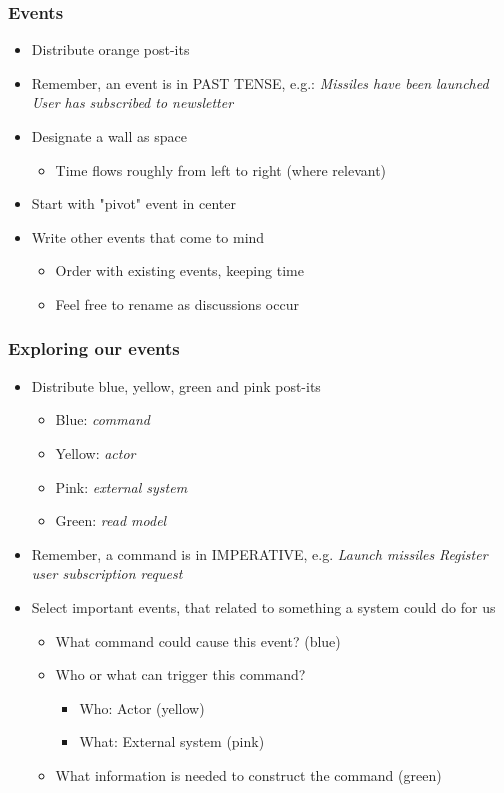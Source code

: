 \documentclass[8pt]{article}
\begin{document}
\subsubsection{Events}
\label{sec:org8a51cbc}
\begin{itemize}
\item Distribute orange post-its

\item Remember, an event is in PAST TENSE, e.g.:
\emph{Missiles have been launched}
\emph{User has subscribed to newsletter}

\item Designate a wall as space
\begin{itemize}
\item Time flows roughly from left to right (where relevant)
\end{itemize}

\item Start with "pivot" event in center

\item Write other events that come to mind
\begin{itemize}
\item Order with existing events, keeping time
\item Feel free to rename as discussions occur
\end{itemize}
\end{itemize}
\subsubsection{Exploring our events}
\label{sec:orgbaddfc4}
\begin{itemize}
\item Distribute blue, yellow, green and pink post-its
\begin{itemize}
\item Blue: \emph{command}
\item Yellow: \emph{actor}
\item Pink: \emph{external system}
\item Green: \emph{read model}
\end{itemize}

\item Remember, a command is in IMPERATIVE, e.g.
\emph{Launch missiles}
\emph{Register user subscription request}

\item Select important events, that related to something a system could do for us
\begin{itemize}
\item What command could cause this event? (blue)
\item Who or what can trigger this command?
\begin{itemize}
\item Who: Actor (yellow)
\item What: External system (pink)
\end{itemize}
\item What information is needed to construct the command (green)
\end{itemize}
\end{itemize}
\end{document}
